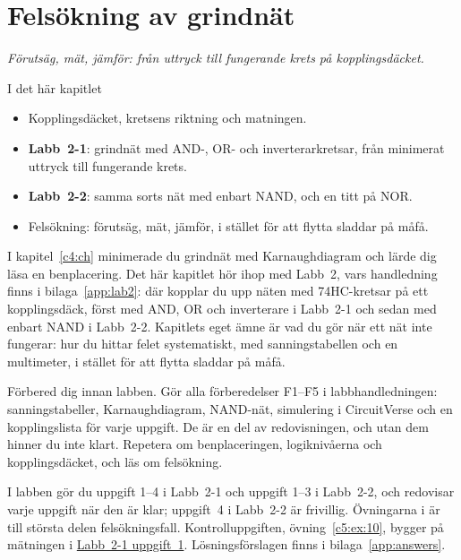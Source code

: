 %

\chapter{Felsökning av grindnät}
\label{c5:ch}

{\large\itshape Förutsäg, mät, jämför: från uttryck till fungerande krets på kopplingsdäcket.\par}

\begin{chapterbox}{I det här kapitlet}
\begin{itemize}
  \item Kopplingsdäcket, kretsens riktning och matningen.
  \item \textbf{Labb~2-1}: grindnät med AND-, OR- och inverterarkretsar, från minimerat uttryck till
    fungerande krets.
  \item \textbf{Labb~2-2}: samma sorts nät med enbart NAND, och en titt på NOR.
  \item Felsökning: förutsäg, mät, jämför, i stället för att flytta sladdar på måfå.
\end{itemize}
\end{chapterbox}

I kapitel~\ref{c4:ch} minimerade du grindnät med Karnaughdiagram och lärde dig läsa en
benplacering. Det här kapitlet hör ihop med Labb~2, vars handledning finns i
bilaga~\ref{app:lab2}: där kopplar du upp näten med 74HC-kretsar på ett kopplingsdäck, först med
AND, OR och inverterare i Labb~2-1 och sedan med enbart NAND i Labb~2-2. Kapitlets eget ämne är
vad du gör när ett nät inte fungerar: hur du hittar felet systematiskt, med sanningstabellen och en
multimeter, i stället för att flytta sladdar på måfå.

Förbered dig innan labben. Gör alla förberedelser F1--F5 i labbhandledningen: sanningstabeller,
Karnaughdiagram, NAND-nät, simulering i CircuitVerse och en kopplingslista för varje uppgift. De är
en del av redovisningen, och utan dem hinner du inte klart. Repetera  om
benplaceringen, logiknivåerna och kopplingsdäcket, och läs  om felsökning.

I labben gör du uppgift 1--4 i Labb~2-1 och uppgift 1--3 i Labb~2-2, och redovisar varje uppgift
när den är klar; uppgift~4 i Labb~2-2 är frivillig. Övningarna i  är till
största delen felsökningsfall. Kontrolluppgiften, övning~\ref{c5:ex:10}, bygger på mätningen i
\hyperref[lab2:1:u1]{Labb~2-1 uppgift~1}. Lösningsförslagen finns i bilaga~\ref{app:answers}.





